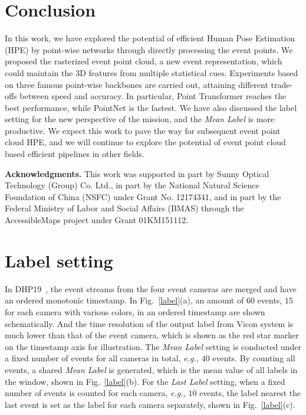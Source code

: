 \documentclass[10pt,twocolumn,letterpaper]{article}
\begin{document}
\section{Conclusion}
In this work, we have explored the potential of efficient Human Pose Estimation (HPE) by point-wise networks through directly processing the event points. We proposed the rasterized event point cloud, a new event representation, which could maintain the 3D features from multiple statistical cues.
Experiments based on three famous point-wise backbones are carried out, attaining different trade-offs between speed and accuracy.
In particular, Point Transformer reaches the best performance, while PointNet is the fastest.
We have also discussed the label setting for the new perspective of the mission, and the \emph{Mean Label} is more productive.
We expect this work to pave the way for subsequent event point cloud HPE, and we will continue to explore the potential of event point cloud based efficient pipelines in other fields.

\noindent\textbf{Acknowledgments.}
This work was supported in part by Sunny Optical Technology (Group) Co. Ltd., in part by the National Natural Science Foundation of China (NSFC) under Grant No. 12174341, and in part by the Federal Ministry of Labor and Social Affairs (BMAS) through the AccessibleMaps project under Grant 01KM151112.

\clearpage
{\small


}

\newpage
\appendix
\section{Label setting}

In DHP19~\cite{calabrese2019dhp19}, the event streams from the four event cameras are merged and have an ordered monotonic timestamp. In Fig.~\ref{label}(a), an amount of $60$ events, $15$ for each camera with various colors, in an ordered timestamp are shown schematically.
And the time resolution of the output label from Vicon system is much lower than that of the event camera, which is shown as the red star marker on the timestamp axis for illustration. The \emph{Mean Label} setting is conducted under a fixed number of events for all cameras in total, \textit{e.g.,} $40$ events. By counting all events, a shared \emph{Mean Label} is generated, which is the mean value of all labels in the window, shown in Fig.~\ref{label}(b). For the \emph{Last Label} setting, when a fixed number of events is counted for each camera, \textit{e.g.,} $10$ events, the label nearest the last event is set as the label for each camera separately, shown in Fig.~\ref{label}(c).
\end{document}
